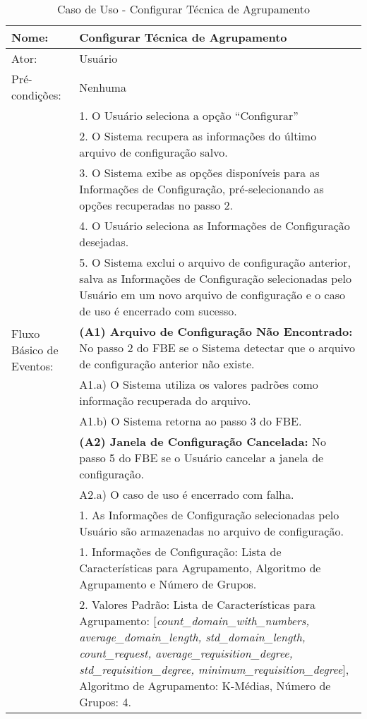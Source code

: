 \begin{table}[]
\centering
\caption{Caso de Uso - Configurar Técnica de Agrupamento}
\label{tab:use_case_config}
\begin{tabular}{|lp{10cm}|}
\hline
Nome: & Configurar Técnica de Agrupamento  \\ \hline
Ator: & Usuário   \\ \hline
Pré-condições: & Nenhuma   \\ \hline
\multirow{12}{*}{Fluxo Básico de Eventos:} & 1. O Usuário seleciona a opção ``Configurar''  \\
 & 2. O Sistema recupera as informações do último arquivo de configuração salvo. \\
 & 3. O Sistema exibe as opções disponíveis para as Informações de Configuração, pré-selecionando as opções recuperadas no passo 2. \\
 & 4. O Usuário seleciona as Informações de Configuração desejadas.  \\
 & 5. O Sistema exclui o arquivo de configuração anterior, salva as Informações de Configuração selecionadas pelo Usuário em um novo arquivo de configuração e o caso de uso é encerrado com sucesso. \\
 \hline
\multirow{9}{*}{Fluxo Alternativo de Eventos:} & \textbf{(A1) Arquivo de Configuração Não Encontrado:} No passo 2 do FBE se o Sistema detectar que o arquivo de configuração anterior não existe.\\
 & A1.a) O Sistema utiliza os valores padrões como informação recuperada do arquivo.\\
 & A1.b) O Sistema retorna ao passo 3 do FBE. \\ 
 & \textbf{(A2) Janela de Configuração Cancelada:} No passo 5 do FBE se o Usuário cancelar a janela de configuração. \\
 & A2.a) O caso de uso é encerrado com falha. \\
 \hline
\multirow{2}{*}{Pós-Condições:} & 1. As Informações de Configuração selecionadas pelo Usuário são armazenadas no arquivo de configuração. \\
\hline
\multirow{10}{*}{Outras Informações:} & 1. Informações de Configuração: Lista de Características para Agrupamento, Algoritmo de Agrupamento e Número de Grupos. \\
 & 2. Valores Padrão: Lista de Características para Agrupamento: [\textit{count\_domain\_with\_numbers, average\_domain\_length, std\_domain\_length, count\_request, average\_requisition\_degree, std\_requisition\_degree, minimum\_requisition\_degree}], Algoritmo de Agrupamento: K-Médias, Número de Grupos: 4. \\
\hline 
\end{tabular}
\end{table}

